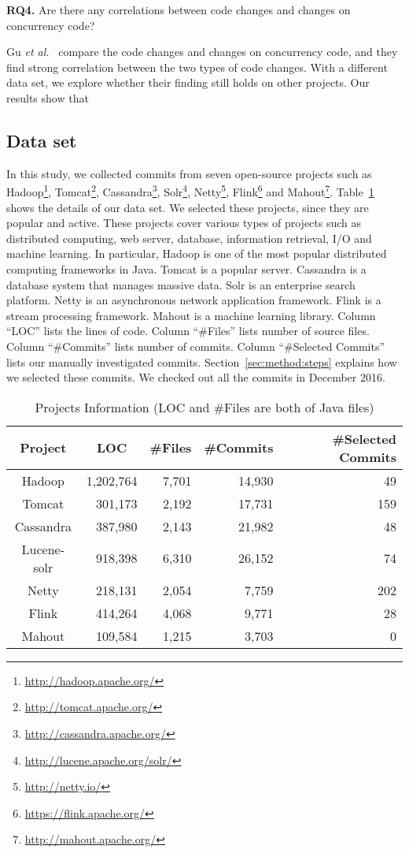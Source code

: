\textbf{RQ4.} Are there any correlations between code changes and changes on concurrency code?

Gu \emph{et al.}~\cite{conf/sigsoft/GuJSZL15} compare the code changes and changes on concurrency code, and they find strong correlation between the two types of code changes. With a different data set, we explore whether their finding still holds on other projects. Our results show that 

\subsection{Data set}
\label{sec:method:data}
In this study, we collected commits from seven open-source projects such as Hadoop\footnote{\url{http://hadoop.apache.org/}}, Tomcat\footnote{\url{http://tomcat.apache.org/}}, Cassandra\footnote{\url{http://cassandra.apache.org/}}, Solr\footnote{\url{http://lucene.apache.org/solr/}}, Netty\footnote{\url{http://netty.io/}}, Flink\footnote{\url{https://flink.apache.org/}} and Mahout\footnote{\url{http://mahout.apache.org/}}. Table~\ref{table:dataset} shows the details of our data set. We selected these projects, since they are popular and active. These projects cover various types of projects such as distributed computing, web server, database, information retrieval, I/O and machine learning. In particular, Hadoop is one of the most popular distributed computing frameworks in Java. Tomcat is a popular server. Cassandra is a database system that manages massive data. Solr is an enterprise search platform. Netty is an asynchronous network application framework. Flink is a stream processing framework. Mahout is a machine learning library. Column ``LOC'' lists the lines of code. Column ``\#Files'' lists number of source files. Column ``\#Commits'' lists number of commits. Column ``\#Selected Commits'' lists our manually investigated commits. Section~\ref{sec:method:steps} explains how we selected these commits. We checked out all the commits in December 2016.

\begin{table}
	\centering
	\caption{Projects Information (LOC and \#Files are both of Java files)}
    \label{table:dataset}
	\begin{tabular}{|c|r|r|r|r|}\hline
		Project&\multicolumn{1}{|c|}{LOC}&\#Files&\#Commits&\#Selected Commits\\\hline
		Hadoop&1,202,764&7,701&14,930&49\\\hline
		Tomcat&301,173&2,192&17,731&159\\\hline
		Cassandra&387,980&2,143&21,982&48\\\hline
		Lucene-solr&918,398&6,310&26,152&74\\\hline
		Netty&218,131&2,054&7,759&202\\\hline
		Flink&414,264&4,068&9,771&28\\\hline
		Mahout&109,584&1,215&3,703&0\\\hline
	\end{tabular}
\end{table}

